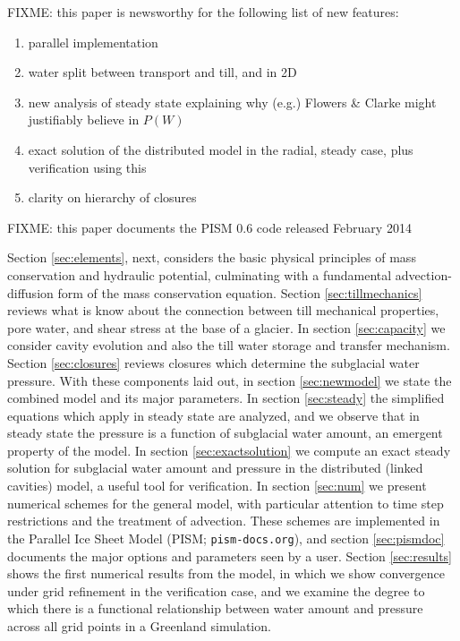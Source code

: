 \documentclass[gmd]{copernicus}   %
\begin{document}
FIXME: this paper is newsworthy for the following list of new features:\begin{enumerate}
\item parallel implementation
\item water split between transport and till, and in 2D
\item new analysis of steady state explaining why (e.g.) Flowers \& Clarke might justifiably believe in $P(W)$
\item exact solution of the distributed model in the radial, steady case, plus verification using this 
\item clarity on hierarchy of closures
\end{enumerate}

FIXME: this paper documents the PISM 0.6 code released February 2014

Section \ref{sec:elements}, next, considers the basic physical principles of mass conservation and hydraulic potential, culminating with a fundamental advection-diffusion form of the mass conservation equation.  Section \ref{sec:tillmechanics} reviews what is know about the connection between till mechanical properties, pore water, and shear stress at the base of a glacier.  In section \ref{sec:capacity} we consider cavity evolution and also the till water storage and transfer mechanism.  Section \ref{sec:closures} reviews closures which determine the subglacial water pressure.  With these components laid out, in section \ref{sec:newmodel} we state the combined model and its major parameters.  In section \ref{sec:steady} the simplified equations which apply in steady state are analyzed, and we observe that in steady state the pressure is a function of subglacial water amount, an emergent property of the model.  In section \ref{sec:exactsolution} we compute an exact steady solution for subglacial water amount and pressure in the distributed (linked cavities) model, a useful tool for verification.  In section \ref{sec:num} we present numerical schemes for the general model, with particular attention to time step restrictions and the treatment of advection.  These schemes are implemented in the Parallel Ice Sheet Model (PISM; \texttt{pism-docs.org}), and section \ref{sec:pismdoc} documents the major options and parameters seen by a user.  Section \ref{sec:results} shows the first numerical results from the model, in which we show convergence under grid refinement in the verification case, and we examine the degree to which there is a functional relationship between water amount and pressure across all grid points in a Greenland simulation.
\end{document}
